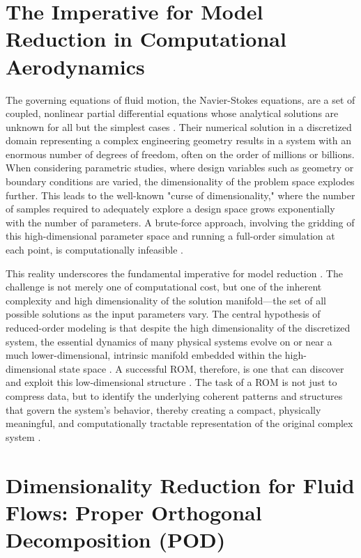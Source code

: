 \documentclass[dsc, EN]{ufabcFHZh}
\begin{document}
\section{The Imperative for Model Reduction in Computational Aerodynamics}

The governing equations of fluid motion, the Navier-Stokes equations, are a set of coupled, nonlinear partial differential equations whose analytical solutions are unknown for all but the simplest cases \citep{berkooz1993proper}. Their numerical solution in a discretized domain representing a complex engineering geometry results in a system with an enormous number of degrees of freedom, often on the order of millions or billions. When considering parametric studies, where design variables such as geometry or boundary conditions are varied, the dimensionality of the problem space explodes further. This leads to the well-known "curse of dimensionality," where the number of samples required to adequately explore a design space grows exponentially with the number of parameters. A brute-force approach, involving the gridding of this high-dimensional parameter space and running a full-order simulation at each point, is computationally infeasible \citep{mifsud2016reduced}.

This reality underscores the fundamental imperative for model reduction \citep{zhang2021review, freund2003model}. The challenge is not merely one of computational cost, but one of the inherent complexity and high dimensionality of the solution manifold—the set of all possible solutions as the input parameters vary. The central hypothesis of reduced-order modeling is that despite the high dimensionality of the discretized system, the essential dynamics of many physical systems evolve on or near a much lower-dimensional, intrinsic manifold embedded within the high-dimensional state space \citep{carlberg2018nonlinear, geelen2022nonlinear}. A successful ROM, therefore, is one that can discover and exploit this low-dimensional structure \citep{mifsud2016reduced}. The task of a ROM is not just to compress data, but to identify the underlying coherent patterns and structures that govern the system's behavior, thereby creating a compact, physically meaningful, and computationally tractable representation of the original complex system \citep{freund2003model}.

\section{Dimensionality Reduction for Fluid Flows: Proper Orthogonal Decomposition (POD)}
\end{document}
